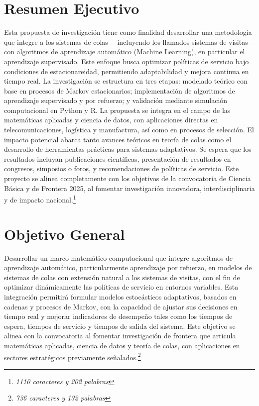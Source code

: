 \documentclass[12pt]{article}
\begin{document}
\newpage

\section{Resumen Ejecutivo}
Esta propuesta de investigación tiene como finalidad desarrollar una metodología que integre a los sistemas de colas —incluyendo los llamados sistemas de visitas— con algoritmos de aprendizaje automático (Machine Learning), en particular el aprendizaje supervisado. Este enfoque busca optimizar políticas de servicio bajo condiciones de estacionareidad, permitiendo adaptabilidad y mejora continua en tiempo real. La investigación se estructura en tres etapas: modelado teórico con base en procesos de Markov estacionarios; implementación de algoritmos de aprendizaje supervisado y por refuerzo; y validación mediante simulación computacional en Python y R. La propuesta se integra en el campo de las matemáticas aplicadas y ciencia de datos, con aplicaciones directas en telecomunicaciones, logística y manufactura, así como en procesos de selección. El impacto potencial abarca tanto avances teóricos en teoría de colas como el desarrollo de herramientas prácticas para sistemas adaptativos. Se espera que los resultados incluyan publicaciones científicas, presentación de resultados en congresos, simposios o foros, y recomendaciones de políticas de servicio. Este proyecto se alinea completamente con los objetivos de la convocatoria de Ciencia Básica y de Frontera 2025, al fomentar investigación innovadora, interdisciplinaria y de impacto nacional.\footnote{\textit{1110 caracteres y 202 palabras}}


\section{Objetivo General}
Desarrollar un marco matemático-computacional que integre algoritmos de aprendizaje automático, particularmente aprendizaje por refuerzo, en modelos de sistemas de colas con extensión natural a los sistemas de visitas, con el fin de optimizar dinámicamente las políticas de servicio en entornos variables. Esta integración permitirá formular modelos estocásticos adaptativos, basados en cadenas y procesos de Markov, con la capacidad de ajustar sus decisiones en tiempo real y mejorar indicadores de desempeño tales como los tiempos de espera, tiempos de servicio y tiempos de salida del sistema. Este objetivo se alinea con la convocatoria al fomentar investigación de frontera que articula matemáticas aplicadas, ciencia de datos y teoría de colas, con aplicaciones en sectores estratégicos previamente señalados.\footnote{\textit{736 caracteres y 132 palabras}}
\end{document}
